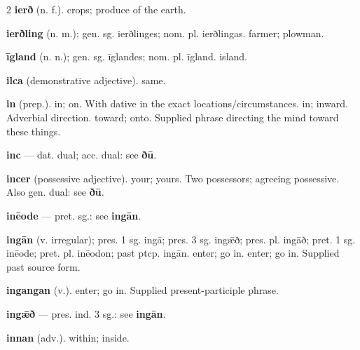 \begin{multicols*}{2}
\textbf{ierð} (n. f.). crops; produce of the earth.\par
\textbf{ierðling} (n. m.); gen. sg. ierðlinges; nom. pl. ierðlingas. farmer; plowman.\par
\textbf{īgland} (n. n.); gen. sg. īglandes; nom. pl. īgland. island.\par
\textbf{ilca} (demonstrative adjective). same.\par
\textbf{in} (prep.). in; on. With dative in the exact locations/circumstances. in; inward. Adverbial direction. toward; onto. Supplied phrase directing the mind toward these things.\par
\textbf{inc} — dat. dual; acc. dual: see \textbf{ðū}.\par
\textbf{incer} (possessive adjective). your; yours. Two possessors; agreeing possessive. Also gen. dual: see \textbf{ðū}.\par
\textbf{inēode} — pret. sg.: see \textbf{ingān}.\par
\textbf{ingān} (v. irregular); pres. 1 sg. ingā; pres. 3 sg. ingǣð; pres. pl. ingāð; pret. 1 sg. inēode; pret. pl. inēodon; past ptcp. ingān. enter; go in. enter; go in. Supplied past source form.\par
\textbf{ingangan} (v.). enter; go in. Supplied present-participle phrase.\par
\textbf{ingǣð} — pres. ind. 3 sg.: see \textbf{ingān}.\par
\textbf{innan} (adv.). within; inside.\par

\end{multicols*}

